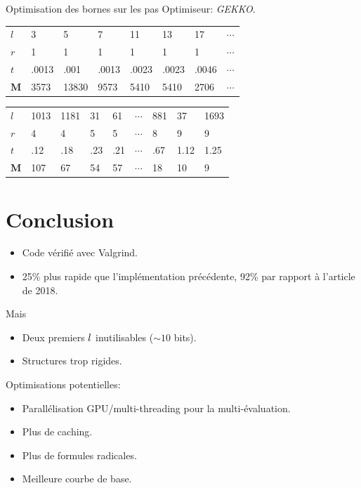 \documentclass{beamer}
\begin{document}
\begin{frame}{Optimisation des bornes sur les pas}
Optimiseur: \textit{GEKKO}.
\begin{table}[h]
\begin{tabular}{llllllll}
\cline{1-1}
\multicolumn{1}{|l|}{$l$} & 3     & 5     & 7     & 11    & 13    & 17     & $\cdots$   \\ \cline{1-1}
$r$                       & 1     & 1     & 1     & 1     & 1     & 1      & $\cdots$   \\
$t$                       & .0013 & .001  & .0013 & .0023 & .0023 & .0046  & $\cdots$   \\
$\mathbf{M}$              & 3573  & 13830 & 9573  & 5410  & 5410  & 2706   & $\cdots$
\end{tabular}
\end{table}

\begin{table}[h]
\begin{tabular}{lllllllll}
\cline{1-1}
\multicolumn{1}{|l|}{$l$} & 1013 & 1181 & 31  & 61  & $\cdots$ &  881 & 37   & 1693 \\ \cline{1-1}
$r$                       & 4    & 4    & 5   & 5   & $\cdots$ &  8   & 9    & 9    \\
$t$                       & .12  & .18  & .23 & .21 & $\cdots$ &  .67 & 1.12 & 1.25 \\
$\mathbf{M}$              & 107  & 67   & 54  & 57  & $\cdots$ &  18  & 10   & 9
\end{tabular}
\end{table}
\end{frame}


\section*{Conclusion}
\begin{frame}
	\begin{itemize}
		\item Code v\'erifi\'e avec Valgrind.
		\item 25\% plus rapide que l'impl\'ementation pr\'ec\'edente, 92\% par rapport \`a l'article de 2018.
	\end{itemize}
	Mais
	\begin{itemize}
		\item Deux premiers $\mathnormal{l}$ inutilisables ($\sim 10$ bits).
		\item Structures trop rigides.
	\end{itemize}
	Optimisations potentielles:
	\begin{itemize}
		\item Parall\'elisation GPU/multi-threading pour la multi-\'evaluation.
		\item Plus de caching.
		\item Plus de formules radicales.
		\item Meilleure courbe de base.
	\end{itemize}
\end{frame}
\end{document}
